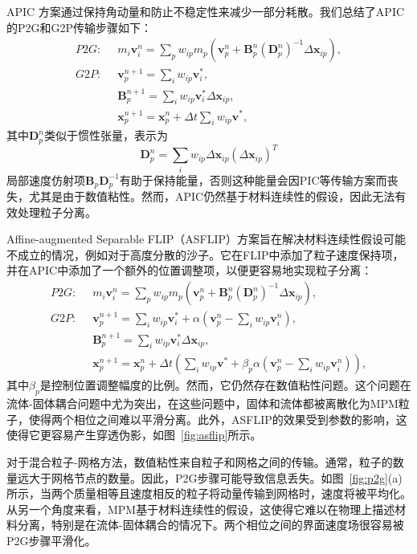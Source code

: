 APIC \cite{jiang2015affine}方案通过保持角动量和防止不稳定性来减少一部分耗散。我们总结了APIC的P2G和G2P传输步骤如下：
\begin{equation}
    \begin{aligned}
    P2G: \;\;    
    &m_i\mathbf{v}_i^n =\sum_{p}w_{ip}m_p(\mathbf{v}_p^n + \mathbf{B}_p^n(\mathbf{D}_p^n)^{-1}\Delta\mathbf{x}_{ip}), \\
    G2P:\;\; & \mathbf{v}_p^{n+1}=\sum_iw_{ip}\mathbf{v}_i^*,\\
    &\mathbf{B}_p^{n+1} = \sum_{i}w_{ip}\mathbf{v}_i^*\Delta\mathbf{x}_{ip},\\
    &\mathbf{x}_p^{n+1}=\mathbf{x}_p^n+\Delta t\sum_iw_{ip}\mathbf{v^*},
    \end{aligned}
\end{equation}
其中$\mathbf{D}_p^n$类似于惯性张量，表示为
\begin{equation}
    \mathbf{D}_p^n=\sum_{i}w_{ip}\Delta\mathbf{x}_{ip}(\Delta\mathbf{x}_{ip})^T
\end{equation}
局部速度仿射项$\mathbf{B}_p\mathbf{D}_p^{-1}$有助于保持能量，否则这种能量会因PIC等传输方案而丧失，尤其是由于数值粘性。然而，APIC仍然基于材料连续性的假设，因此无法有效处理粒子分离。

Affine-augmented Separable FLIP（ASFLIP）方案\cite{fei2021revisiting}旨在解决材料连续性假设可能不成立的情况，例如对于高度分散的沙子。它在FLIP中添加了粒子速度保持项，并在APIC中添加了一个额外的位置调整项，以便更容易地实现粒子分离：
\begin{equation}
    \begin{aligned}
    P2G: \;\;    
    &m_i\mathbf{v}_i^n =\sum_{p}w_{ip}m_p(\mathbf{v}_p^n + \mathbf{B}_p^n(\mathbf{D}_p^n)^{-1}\Delta\mathbf{x}_{ip}), \\
    G2P:\;\; & \mathbf{v}_p^{n+1}=\sum_iw_{ip}\mathbf{v}_i^*+ \alpha(\mathbf{v}_p^n-\sum_iw_{ip}\mathbf{v}_i^n),\\
    &\mathbf{B}_p^{n+1} = \sum_{i}w_{ip}\mathbf{v}_i^*\Delta\mathbf{x}_{ip},\\
    &\mathbf{x}_p^{n+1}=\mathbf{x}_p^n+\Delta t(\sum_iw_{ip}\mathbf{v^*}+ \beta_p\alpha(\mathbf{v}_p^n-\sum_iw_{ip}\mathbf{v}_i^n)),
    \end{aligned}
\end{equation}
其中$\beta_p$是控制位置调整幅度的比例。然而，它仍然存在数值粘性问题。这个问题在流体-固体耦合问题中尤为突出，在这些问题中，固体和流体都被离散化为MPM粒子，使得两个相位之间难以平滑分离。此外，ASFLIP的效果受到参数的影响，这使得它更容易产生穿透伪影，如图~\ref{fig:asflip}所示。

对于混合粒子-网格方法，数值粘性来自粒子和网格之间的传输。通常，粒子的数量远大于网格节点的数量。因此，P2G步骤可能导致信息丢失。如图~\ref{fig:p2g}(a)所示，当两个质量相等且速度相反的粒子将动量传输到网格时，速度将被平均化。从另一个角度来看，MPM基于材料连续性的假设，这使得它难以在物理上描述材料分离，特别是在流体-固体耦合的情况下。两个相位之间的界面速度场很容易被P2G步骤平滑化。
